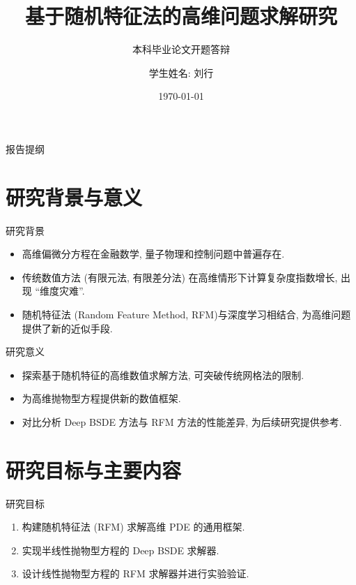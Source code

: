 \documentclass[aspectratio=169,10pt]{beamer}
\title{基于随机特征法的高维问题求解研究}
\subtitle{本科毕业论文开题答辩}
\author{学生姓名: 刘行}
\institute{中国科学技术大学大学\quad 少年班学院}
\date{\today}
\begin{document}
    \begin{frame}
        \titlepage
    \end{frame}

    \begin{frame}{报告提纲}
        \tableofcontents
    \end{frame}

    \section{研究背景与意义}
    \begin{frame}{研究背景}
        \begin{itemize}
            \item 高维偏微分方程在金融数学, 量子物理和控制问题中普遍存在.
            \item 传统数值方法 (有限元法, 有限差分法) 在高维情形下计算复杂度指数增长, 出现 ``维度灾难''.
            \item 随机特征法 (Random Feature Method, RFM)与深度学习相结合, 为高维问题提供了新的近似手段.
        \end{itemize}
    \end{frame}

    \begin{frame}{研究意义}
        \begin{itemize}
            \item 探索基于随机特征的高维数值求解方法, 可突破传统网格法的限制.
            \item 为高维抛物型方程提供新的数值框架.
            \item 对比分析 Deep BSDE 方法与 RFM 方法的性能差异, 为后续研究提供参考.
        \end{itemize}
    \end{frame}

    \section{研究目标与主要内容}
    \begin{frame}{研究目标}
        \begin{enumerate}
            \item 构建随机特征法 (RFM) 求解高维 PDE 的通用框架.
            \item 实现半线性抛物型方程的 Deep BSDE 求解器.
            \item 设计线性抛物型方程的 RFM 求解器并进行实验验证.
        \end{enumerate}
    \end{frame}
\end{document}
